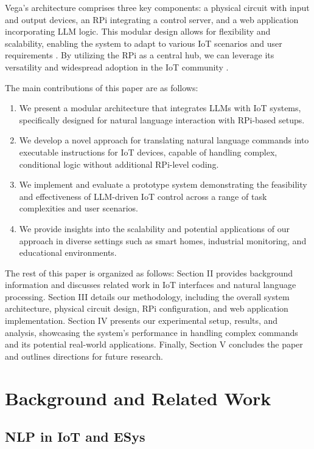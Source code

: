 \documentclass{ieeeaccess}
\begin{document}
Vega's architecture comprises three key components: a physical circuit with input and output devices, an RPi integrating a control server, and a web application incorporating LLM logic. This modular design allows for flexibility and scalability, enabling the system to adapt to various IoT scenarios and user requirements \cite{taylor2010software}. By utilizing the RPi as a central hub, we can leverage its versatility and widespread adoption in the IoT community \cite{8067944}.

The main contributions of this paper are as follows:

\begin{enumerate}
    \item We present a modular architecture that integrates LLMs with IoT systems, specifically designed for natural language interaction with RPi-based setups.
    \item We develop a novel approach for translating natural language commands into executable instructions for IoT devices, capable of handling complex, conditional logic without additional RPi-level coding.
    \item We implement and evaluate a prototype system demonstrating the feasibility and effectiveness of LLM-driven IoT control across a range of task complexities and user scenarios.
    \item We provide insights into the scalability and potential applications of our approach in diverse settings such as smart homes, industrial monitoring, and educational environments.
\end{enumerate}

The rest of this paper is organized as follows: Section II provides background information and discusses related work in IoT interfaces and natural language processing. Section III details our methodology, including the overall system architecture, physical circuit design, RPi configuration, and web application implementation. Section IV presents our experimental setup, results, and analysis, showcasing the system's performance in handling complex commands and its potential real-world applications. Finally, Section V concludes the paper and outlines directions for future research.

\section{Background and Related Work}
\label{sec:background}

\subsection{NLP in IoT and ESys}
\end{document}
